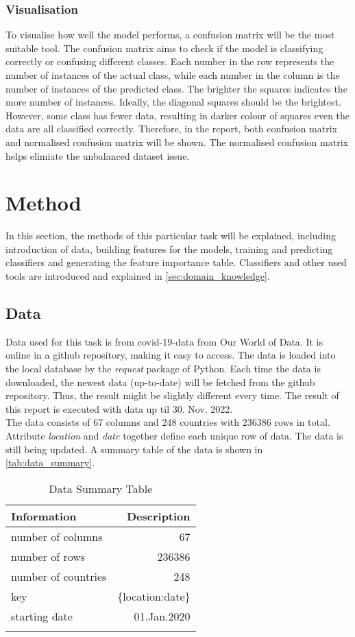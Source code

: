 \documentclass[10pt, a4paper, twocolumn]{article} %
\begin{document}
\subsubsection{Visualisation}
To visualise how well the model performs, a confusion matrix will be the most suitable tool. The confusion matrix aims 
to check if the model is classifying correctly or confusing different classes. Each number in the row represents the 
number of instances of the actual class, while each number in the column is the number of instances of the predicted 
class. The brighter the squares indicates the more number of instances. Ideally, the diagonal squares should be the 
brightest. However, some class has fewer data, resulting in darker colour of squares even the data are all classified 
correctly. Therefore, in the report, both confusion matrix and normalised confusion matrix will be shown. The normalised 
confusion matrix helps elimiate the unbalanced dataset issue. 
\section{Method}
In this section, the methods of this particular task will be explained, including introduction of data, building 
features for the models, training and predicting classifiers and generating the feature importance table. 
Classifiers and other used tools are introduced and explained in \autoref{sec:domain_knowledge}.
\subsection{Data}
Data used for this task is from covid-19-data from Our World of Data. It is online in a github repository, making 
it easy to access. The data is loaded into the local database by the \emph{request} package of Python. Each time 
the data is downloaded, the newest data (up-to-date) will be fetched from the github repository. Thus, 
the result might be slightly different every time. The result of this report is executed with data up til 30. Nov. 2022.\\[10pt]
The data consists of 67 columns and 248 countries with 236386 rows in total. Attribute \emph{location} and 
\emph{date} together define each unique row of data. The data is still being updated. 
A summary table of the data is shown 
in \autoref{tab:data_summary}.
\begin{table}
	\caption{Data Summary Table}
	\centering
	\begin{tabular}{lr}
		\toprule
		\textbf{Information} & \textbf{Description} \\
		\midrule
		number of columns & 67 \\
		number of rows & 236386 \\
		number of countries & 248 \\
		key & \{location:date\}\\
		starting date & 01.Jan.2020\\
		\bottomrule
	\label{tab:data_summary}
	\end{tabular}
\end{table}
\end{document}
